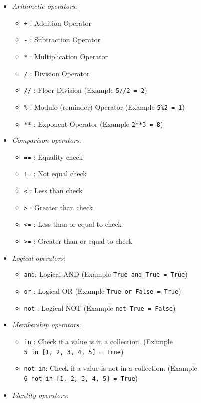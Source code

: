 \documentclass[
  paper=a4,
  ,captions=tableheading
]{scrartcl}
\providecommand{\tightlist}{%
  \setlength{\itemsep}{0pt}\setlength{\parskip}{0pt}}
\begin{document}
\begin{itemize}
\tightlist
\item
  \emph{Arithmetic operators}:

  \begin{itemize}
  \tightlist
  \item
    \texttt{+} : Addition Operator
  \item
    \texttt{-} : Subtraction Operator
  \item
    \texttt{*} : Multiplication Operator
  \item
    \texttt{/} : Division Operator
  \item
    \texttt{//} : Floor Division (Example \texttt{5//2\ =\ 2})
  \item
    \texttt{\%} : Modulo (reminder) Operator (Example
    \texttt{5\%2\ =\ 1})
  \item
    \texttt{**} : Exponent Operator (Example \texttt{2**3\ =\ 8})
  \end{itemize}
\item
  \emph{Comparison operators}:

  \begin{itemize}
  \tightlist
  \item
    \texttt{==} : Equality check
  \item
    \texttt{!=} : Not equal check
  \item
    \texttt{\textless{}} : Less than check
  \item
    \texttt{\textgreater{}} : Greater than check
  \item
    \texttt{\textless{}=} : Less than or equal to check
  \item
    \texttt{\textgreater{}=} : Greater than or equal to check
  \end{itemize}
\item
  \emph{Logical operators}:

  \begin{itemize}
  \tightlist
  \item
    \texttt{and}: Logical AND (Example
    \texttt{True\ and\ True\ =\ True})
  \item
    \texttt{or} : Logical OR (Example \texttt{True\ or\ False\ =\ True})
  \item
    \texttt{not} : Logical NOT (Example \texttt{not\ True\ =\ False})
  \end{itemize}
\item
  \emph{Membership operators}:

  \begin{itemize}
  \tightlist
  \item
    \texttt{in} : Check if a value is in a collection. (Example
    \texttt{5\ in\ {[}1,\ 2,\ 3,\ 4,\ 5{]}\ =\ True})
  \item
    \texttt{not\ in}: Check if a value is not in a collection. (Example
    \texttt{6\ not\ in\ {[}1,\ 2,\ 3,\ 4,\ 5{]}\ =\ True})
  \end{itemize}
\item
  \emph{Identity operators}:


\end{itemize}
\end{document}
